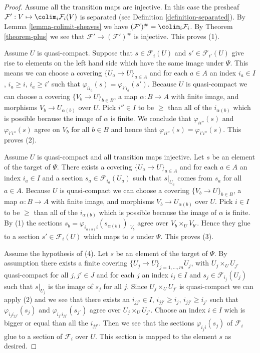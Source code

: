 \begin{proof}
Assume all the transition maps are injective. In this case the presheaf
$\mathcal{F}' : V \mapsto \colim_i \mathcal{F}_i(V)$ is
separated (see Definition \ref{definition-separated}).
By Lemma \ref{lemma-colimit-sheaves}
we have
$(\mathcal{F}')^\# = \colim_i \mathcal{F}_i$.
By Theorem \ref{theorem-plus}
we see that $\mathcal{F}' \to (\mathcal{F}')^\#$ is injective.
This proves (1).

\medskip\noindent
Assume $U$ is quasi-compact. Suppose that $s \in \mathcal{F}_i(U)$ and
$s' \in \mathcal{F}_{i'}(U)$ give rise to elements on
the left hand side which have the same image under $\Psi$.
This means we can choose a covering $\{U_a \to U\}_{a \in A}$
and for each $a \in A$ an index $i_a \in I$, $i_a \geq i$, $i_a \geq i'$
such that $\varphi_{ii_a}(s) = \varphi_{i'i_a}(s')$.
Because $U$ is quasi-compact we can choose a covering
$\{V_b \to U\}_{b \in B}$, a map $\alpha : B \to A$ with finite image,
and morphisms $V_b \to U_{\alpha(b)}$ over $U$.
Pick $i''\in I$ to be $\geq$ than all of the $i_{\alpha(b)}$
which is possible because the image of $\alpha$ is finite.
We conclude that $\varphi_{ii''}(s)$ and $\varphi_{i'i''}(s)$
agree on $V_b$ for all $b \in B$ and hence that
$\varphi_{ii''}(s) = \varphi_{i'i''}(s)$. This proves (2).

\medskip\noindent
Assume $U$ is quasi-compact and all transition maps injective.
Let $s$ be an element of the target of $\Psi$. There exists a covering
$\{U_a \to U\}_{a \in A}$ and for each $a \in A$ an index $i_a \in I$
and a section $s_a \in \mathcal{F}_{i_a}(U_a)$
such that $s|_{U_a}$ comes from $s_a$ for all $a \in A$.
Because $U$ is quasi-compact we can choose a covering
$\{V_b \to U\}_{b \in B}$, a map $\alpha : B \to A$ with finite image,
and morphisms $V_b \to U_{\alpha(b)}$ over $U$.
Pick $i \in I$ to be $\geq$ than all of the $i_{\alpha(b)}$
which is possible because the image of $\alpha$ is finite.
By (1) the sections
$s_b = \varphi_{i_{\alpha(b)} i}(s_{\alpha(b)})|_{V_b}$
agree over $V_b \times_U V_{b'}$.
Hence they glue to a section
$s' \in \mathcal{F}_i(U)$ which maps to $s$ under $\Psi$.
This proves (3).

\medskip\noindent
Assume the hypothesis of (4).
Let $s$ be an element of the target of $\Psi$.
By assumption there  exists a finite covering
$\{U_j \to U\}_{j = 1, \ldots, m} U_j$, with $U_j \times_U U_{j'}$
quasi-compact for all $j, j' \in J$ and
for each $j$ an index $i_j \in I$ and $s_j \in \mathcal{F}_{i_j}(U_j)$
such that $s|_{U_j}$ is the image of $s_j$ for all $j$.
Since $U_j \times_U U_{j'}$ is quasi-compact we can apply (2)
and we see that there exists an $i_{jj'} \in I$,
$i_{jj'} \geq i_j$, $i_{jj'} \geq i_{j'}$ such that
$\varphi_{i_ji_{jj'}}(s_j)$ and $\varphi_{i_{j'}i_{jj'}}(s_{j'})$
agree over $U_j \times_U U_{j'}$. Choose an index $i \in I$
wich is bigger or equal than all the $i_{jj'}$. Then we see that
the sections $\varphi_{i_ji}(s_j)$ of $\mathcal{F}_i$ glue
to a section of $\mathcal{F}_i$ over $U$. This section is mapped
to the element $s$ as desired.
\end{proof}









